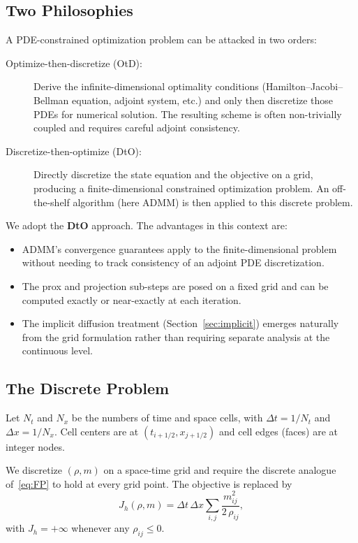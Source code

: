 \documentclass[11pt]{article}
\begin{document}
\subsection{Two Philosophies}

A PDE-constrained optimization problem can be attacked in two orders:

\begin{description}
  \item[Optimize-then-discretize (OtD):]
    Derive the infinite-dimensional optimality conditions (Hamilton--Jacobi--Bellman
    equation, adjoint system, etc.) and only then discretize those PDEs for
    numerical solution.  The resulting scheme is often non-trivially coupled
    and requires careful adjoint consistency.

  \item[Discretize-then-optimize (DtO):]
    Directly discretize the state equation and the objective on a grid,
    producing a finite-dimensional constrained optimization problem.  An
    off-the-shelf algorithm (here ADMM) is then applied to this discrete
    problem.
\end{description}

We adopt the \textbf{DtO} approach.  The advantages in this context are:
\begin{itemize}
  \item ADMM's convergence guarantees apply to the finite-dimensional problem
        without needing to track consistency of an adjoint PDE discretization.
  \item The prox and projection sub-steps are posed on a fixed grid and can
        be computed exactly or near-exactly at each iteration.
  \item The implicit diffusion treatment (Section~\ref{sec:implicit}) emerges
        naturally from the grid formulation rather than requiring separate
        analysis at the continuous level.
\end{itemize}

\subsection{The Discrete Problem}

Let $N_t$ and $N_x$ be the numbers of time and space cells, with
$\Delta t = 1/N_t$ and $\Delta x = 1/N_x$.  Cell centers are at
$(t_{i+1/2}, x_{j+1/2})$ and cell edges (faces) are at integer nodes.

We discretize $(\rho, m)$ on a space-time grid and require the discrete
analogue of~\eqref{eq:FP} to hold at every grid point.  The objective is
replaced by
\begin{equation}
  J_h(\rho, m)
  = \Delta t\,\Delta x \sum_{i,j} \frac{m_{ij}^2}{2\,\rho_{ij}},
  \label{eq:discrete_obj}
\end{equation}
with $J_h = +\infty$ whenever any $\rho_{ij} \leq 0$.
\end{document}
